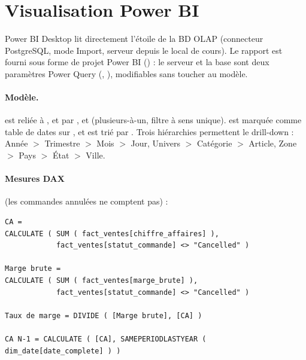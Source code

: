 \documentclass[11pt,a4paper]{article}
\begin{document}
\section{Visualisation Power BI}

Power BI Desktop lit directement l'étoile de la BD OLAP (connecteur PostgreSQL, mode Import,
serveur  depuis le local de cours). Le rapport est fourni sous forme de projet
Power BI () : le serveur et la base sont deux paramètres Power Query
(, ), modifiables sans toucher au modèle.

\paragraph{Modèle.}  est reliée à ,  et
 par ,  et  (plusieurs-à-un,
filtre à sens unique).  est marquée comme table de dates sur ,
et  est trié par . Trois hiérarchies permettent le drill-down :
Année $>$ Trimestre $>$ Mois $>$ Jour, Univers $>$ Catégorie $>$ Article,
Zone $>$ Pays $>$ État $>$ Ville.

\paragraph{Mesures DAX} (les commandes annulées ne comptent pas) :

\begin{lstlisting}
CA =
CALCULATE ( SUM ( fact_ventes[chiffre_affaires] ),
            fact_ventes[statut_commande] <> "Cancelled" )

Marge brute =
CALCULATE ( SUM ( fact_ventes[marge_brute] ),
            fact_ventes[statut_commande] <> "Cancelled" )

Taux de marge = DIVIDE ( [Marge brute], [CA] )

CA N-1 = CALCULATE ( [CA], SAMEPERIODLASTYEAR ( dim_date[date_complete] ) )
\end{lstlisting}
\end{document}
